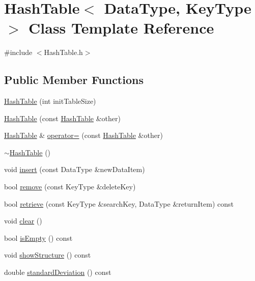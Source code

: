 \hypertarget{class_hash_table}{\section{Hash\-Table$<$ Data\-Type, Key\-Type $>$ Class Template Reference}
\label{class_hash_table}
}


{\ttfamily \#include $<$Hash\-Table.\-h$>$}

\subsection*{Public Member Functions}
\begin{DoxyCompactItemize}
\item 
\hyperlink{class_hash_table_a103b09f30dbac0fe92fc2f1192feb0c1}{Hash\-Table} (int init\-Table\-Size)
\item 
\hyperlink{class_hash_table_a5da00f8a0dc9dc745675a96eac228049}{Hash\-Table} (const \hyperlink{class_hash_table}{Hash\-Table} \&other)
\item 
\hyperlink{class_hash_table}{Hash\-Table} \& \hyperlink{class_hash_table_add76a73a92b81a2d54c20078d4a76546}{operator=} (const \hyperlink{class_hash_table}{Hash\-Table} \&other)
\item 
\hyperlink{class_hash_table_ae25eb9c66b9bce8c9c04f18e22688a15}{$\sim$\-Hash\-Table} ()
\item 
void \hyperlink{class_hash_table_adc8f2be061729bdc5ecb171b54304e17}{insert} (const Data\-Type \&new\-Data\-Item)
\item 
bool \hyperlink{class_hash_table_a46d3f8ad70fd80dc7aa64f50676ef7a5}{remove} (const Key\-Type \&delete\-Key)
\item 
bool \hyperlink{class_hash_table_ad4ee3ff641daa330260a48de29492e66}{retrieve} (const Key\-Type \&search\-Key, Data\-Type \&return\-Item) const 
\item 
void \hyperlink{class_hash_table_a57f581334e35d45a8822c03edc0fcca6}{clear} ()
\item 
bool \hyperlink{class_hash_table_a101e211a7fca37cd90722e15df2fc571}{is\-Empty} () const 
\item 
void \hyperlink{class_hash_table_a8b875e57f71a5bbba394e42361fb9fb4}{show\-Structure} () const 
\item 
double \hyperlink{class_hash_table_a4db2d920fd7c632f5b4b1bacd503bbf1}{standard\-Deviation} () const 
\end{DoxyCompactItemize}


